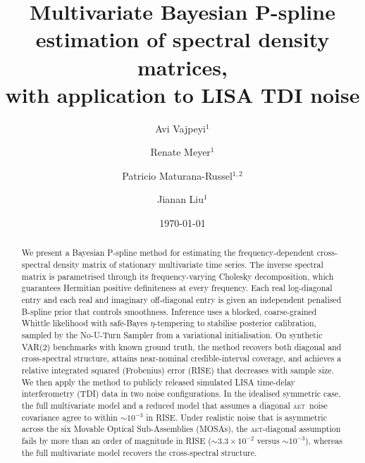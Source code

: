 \documentclass[%
	reprint,
	nofootinbib,
	amsmath,
	amssymb,
	aps,
]{revtex4-2}
\newcommand{\AET}{\textsc{aet}\xspace}
\begin{document}

	\title{Multivariate Bayesian P-spline estimation of spectral density matrices,\\
		with application to LISA TDI noise}

    \author{Avi Vajpeyi$^{1}$}
    \author{Renate Meyer$^{1}$}
    \author{Patricio Maturana-Russel$^{1,2}$}
    \author{Jianan Liu$^{1}$}
    

	\date{\today}

	\begin{abstract}
		We present a Bayesian P-spline method for estimating the
    frequency-dependent cross-spectral density matrix of stationary
    multivariate time series. The inverse spectral matrix is parametrised
    through its frequency-varying Cholesky decomposition, which
    guarantees Hermitian positive definiteness at every frequency. Each
    real log-diagonal entry and each real and imaginary off-diagonal
    entry is given an independent penalised B-spline prior that controls
    smoothness. Inference uses a blocked, coarse-grained Whittle
    likelihood with safe-Bayes $\eta$-tempering to stabilise posterior
    calibration, sampled by the No-U-Turn Sampler from a variational
    initialisation. On synthetic VAR(2) benchmarks with known ground
    truth, the method recovers both diagonal and cross-spectral
    structure, attains near-nominal credible-interval coverage, and
    achieves a relative integrated squared (Frobenius) error (RISE) that
    decreases with sample size. We then apply the method to publicly
    released simulated LISA time-delay interferometry (TDI) data in two
    noise configurations. In the idealised symmetric case, the full
    multivariate model and a reduced model that assumes a diagonal
    \AET\ noise covariance agree to within $\sim10^{-3}$ in RISE.
    Under realistic noise that is asymmetric across the six Movable
    Optical Sub-Assemblies (MOSAs), the \AET-diagonal
    assumption fails by more than an order of magnitude in RISE
    ($\sim\!3.3\!\times\!10^{-2}$ versus $\sim\!10^{-3}$), whereas the
    full multivariate model recovers the cross-spectral structure.
	\end{abstract}

\end{document}
